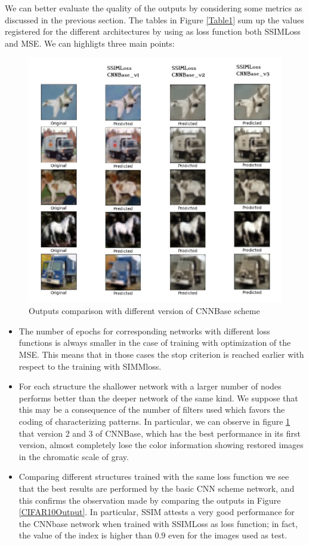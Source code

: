 \documentclass[12pt,a4paper]{article}
\begin{document}
We can better evaluate the quality of the outputs by considering some metrics as discussed in the previous section. The tables in Figure \ref{Table1} sum up the values registered for the different architectures by using as loss function both SSIMLoss and MSE. We can highligts three main points:

\begin{figure}[hptb]
\centering
\includegraphics[scale=0.45]{CNNBase_comparison.png}
\caption{Outputs comparison with different version of CNNBase scheme}
\label{CNNBase_comparison}
\end{figure}

\begin{itemize}
\item The number of epochs for corresponding networks with different loss functions is always smaller in the case of training with optimization of the MSE. This means that in those cases the stop criterion is reached earlier with respect to the training with SIMMloss.
\item For each structure the shallower network with a larger number of nodes performs better than the deeper network of the same kind. We suppose that this may be a consequence of the number of filters used which favors the coding of characterizing patterns. In particular, we can observe in figure \ref{CNNBase_comparison} that version 2 and 3 of CNNBase, which has the best performance in its first version, almost completely lose the color information showing restored images in the chromatic scale of gray.
\item Comparing different structures trained with the same loss function we see that the best results are performed by the basic CNN scheme network, and this confirms the observation made by comparing the outputs in Figure \ref{CIFAR10Output}. In particular, SSIM attests a very good performance for the CNNbase network when trained with SSIMLoss as loss function; in fact, the value of the index is higher than $0.9$ even for the images used as test.
\end{itemize}
\end{document}

